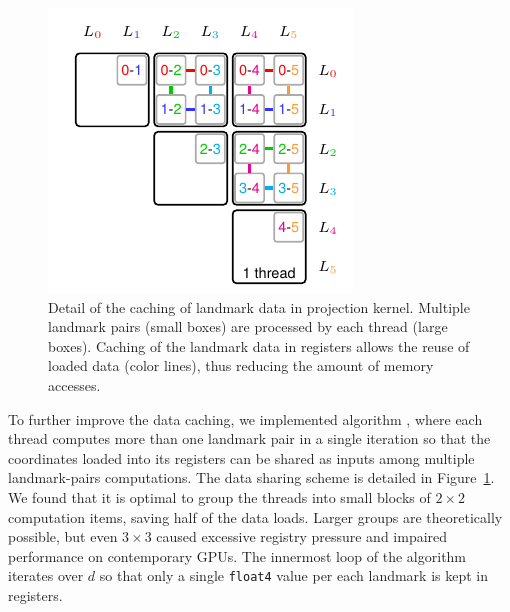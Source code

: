 \begin{figure}
\centering
\includegraphics{embedsom/pic/reg-caching.pdf}
\caption{Detail of the caching of landmark data in  projection kernel. Multiple landmark pairs (small boxes) are processed by each thread (large boxes). Caching of the landmark data in registers allows the reuse of loaded data (color lines), thus reducing the amount of memory accesses.}
\label{fig:proj}
\end{figure}

To further improve the data caching, we implemented algorithm , where each thread computes more than one landmark pair in a single iteration so that the coordinates loaded into its registers can be shared as inputs among multiple landmark-pairs computations.
The data sharing scheme is detailed in Figure~\ref{fig:proj}.
We found that it is optimal to group the threads into small blocks of $2\times2$ computation items, saving half of the data loads.
Larger groups are theoretically possible, but even $3\times3$ caused excessive registry pressure and impaired performance on contemporary GPUs.
The innermost loop of the algorithm iterates over $d$ so that only a single \texttt{float4} value per each landmark is kept in registers.

